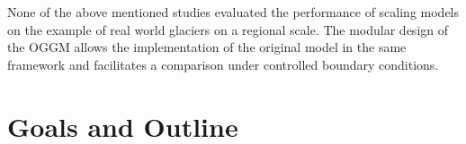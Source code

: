     None of the above mentioned studies evaluated the performance of scaling models on the example of real world glaciers on a regional scale. The modular design of the OGGM allows the implementation of the original \citet{Marzeion2012b} model in the same framework and facilitates a comparison under controlled boundary conditions.



\section{Goals and Outline} %
\label{sec:goals_and_outline}



